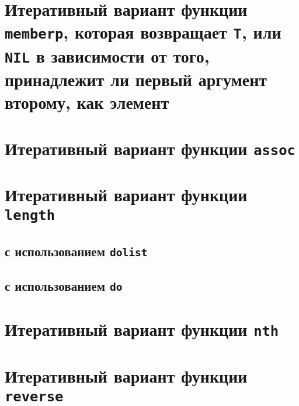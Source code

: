 
\section{Итеративный вариант функции \texttt{memberp}, которая возвращает \texttt{T}, или \texttt{NIL} в зависимости от того, принадлежит ли первый аргумент второму, как элемент}




\section{Итеративный вариант функции \texttt{assoc}}




\section{Итеративный вариант функции \texttt{length}}

\subsection{с использованием \texttt{dolist}}



\subsection{с использованием \texttt{do}}




\section{Итеративный вариант функции \texttt{nth}}




\section{Итеративный вариант функции \texttt{reverse}}





